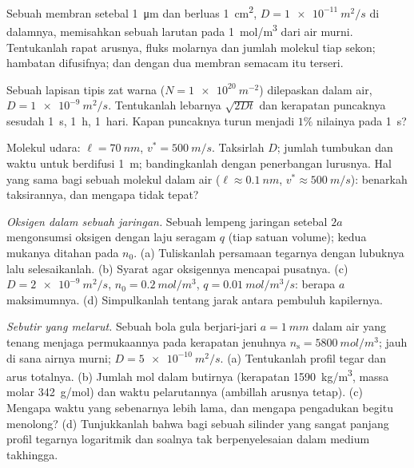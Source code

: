 \begin{exercise}[$\star$]\label{exo:b2:particle-diffusion:2}
Sebuah membran setebal \qty{1}{\micro m} dan berluas \qty{1}{cm^2}, $D =
\qty{1e-11}{m^2/s}$ di dalamnya, memisahkan sebuah larutan pada \qty{1}{mol/m^3}
dari air murni. Tentukanlah rapat arusnya, fluks molarnya dan jumlah molekul
tiap sekon; hambatan difusifnya; dan dengan dua membran semacam itu terseri.
\end{exercise}

\begin{exercise}[$\star$]\label{exo:b2:particle-diffusion:3}
Sebuah lapisan tipis zat warna ($N = \qty{1e20}{m^{-2}}$) dilepaskan dalam air,
$D = \qty{1e-9}{m^2/s}$. Tentukanlah lebarnya $\sqrt{2Dt}$ dan kerapatan puncaknya sesudah
\qty{1}{s}, \qty{1}{h}, \qty{1}{hari}. Kapan puncaknya turun menjadi
$1\%$ nilainya pada \qty{1}{s}?
\end{exercise}

\begin{exercise}[$\star$]\label{exo:b2:particle-diffusion:4}
Molekul udara: $\ell = \qty{70}{nm}$, $v^* = \qty{500}{m/s}$. Taksirlah
$D$; jumlah tumbukan dan waktu untuk berdifusi \qty{1}{m}; bandingkanlah dengan
penerbangan lurusnya. Hal yang sama bagi sebuah molekul dalam air ($\ell \approx
\qty{0.1}{nm}$, $v^* \approx \qty{500}{m/s}$): benarkah taksirannya, dan
mengapa tidak tepat?
\end{exercise}

\begin{exercise}[$\star\star$]\label{exo:b2:particle-diffusion:5}
\emph{Oksigen dalam sebuah jaringan.} Sebuah lempeng jaringan setebal $2a$ mengonsumsi
oksigen dengan laju seragam $q$ (tiap satuan volume); kedua mukanya
ditahan pada $n_0$. (a) Tuliskanlah persamaan tegarnya dengan lubuknya lalu selesaikanlah.
(b) Syarat agar oksigennya mencapai pusatnya. (c) $D = \qty{2e-9}{m^2/s}$,
$n_0 = \qty{0.2}{mol/m^3}$, $q = \qty{0.01}{mol/m^3/s}$: berapa $a$ maksimumnya. (d)
Simpulkanlah tentang jarak antara pembuluh kapilernya.
\end{exercise}

\begin{exercise}[$\star\star$]\label{exo:b2:particle-diffusion:6}
\emph{Sebutir yang melarut.} Sebuah bola gula berjari-jari $a = \qty{1}{mm}$
dalam air yang tenang menjaga permukaannya pada kerapatan jenuhnya $n_{\text{s}}
= \qty{5800}{mol/m^3}$; jauh di sana airnya murni; $D =
\qty{5e-10}{m^2/s}$. (a) Tentukanlah profil tegar dan arus totalnya. (b)
Jumlah mol dalam butirnya (kerapatan \qty{1590}{kg/m^3}, massa molar
\qty{342}{g/mol}) dan waktu pelarutannya (ambillah arusnya tetap).
(c) Mengapa waktu yang sebenarnya lebih lama, dan mengapa pengadukan begitu menolong?
(d) Tunjukkanlah bahwa bagi sebuah silinder yang sangat panjang profil tegarnya
logaritmik dan soalnya tak berpenyelesaian dalam medium takhingga.
\end{exercise}

